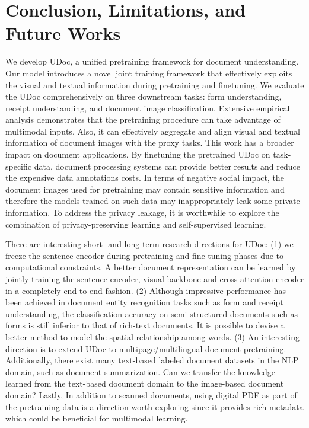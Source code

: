 \documentclass{article}
\begin{document}
	\section{Conclusion, Limitations, and Future Works}
	{We} develop UDoc, a unified pretraining framework for document understanding.  Our model introduces a novel joint training framework that effectively exploits the visual and textual information during pretraining and finetuning. We evaluate the UDoc comprehensively on three downstream tasks: form understanding, receipt understanding, and document image classification. Extensive empirical analysis demonstrates that the pretraining procedure can take advantage of multimodal inputs. Also, it can effectively aggregate and align visual and textual information of document images with the proxy tasks. This work has a broader impact on document applications. By finetuning the pretrained UDoc on task-specific data, document processing systems can provide better results and reduce {the expensive data annotations costs}. In terms of negative social impact, {the} document images {used for pretraining may} contain sensitive information {and therefore the} models trained on such data may {inappropriately} leak some {private} information. To address the privacy leakage, it is worthwhile to explore the combination of privacy-preserving {learning} and self-supervised learning.
	
	There are {interesting} {short- and long-term} research directions {for} UDoc:
	(1) we freeze the sentence encoder during pretraining and fine-tuning {phases} due to {computational constraints}. {A} better document representation can be learned by jointly training {the} sentence encoder, visual backbone and cross-attention encoder in a {completely} end-to-end fashion.
	(2) {Although} impressive performance has been achieved in document entity recognition tasks such as form and receipt understanding, the classification accuracy {on} semi-structured documents such as forms is still {inferior to that of} rich-text documents. {It is possible to devise} a better method to model the spatial relationship among words.
	(3) {An interesting direction is to} extend UDoc to multipage/multilingual document pretraining. Additionally, there {exist} many text-based labeled document datasets in the NLP domain, such as document summarization.
	Can we transfer the knowledge learned from the text-based document domain to the image-based document domain? 
	Lastly,  In addition to scanned documents, {using} digital PDF as {part of the} pretraining data is {a direction} worth exploring since it provides rich metadata {which {could be} beneficial for} multimodal learning.
	
	
	
\end{document}
